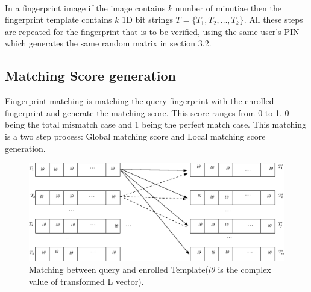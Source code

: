 \documentclass[14pt, oneside]{article}   	%
\begin{document}
\paragraph{}
In a fingerprint image if the image contains $k$ number of minutiae then the fingerprint template contains $k$ 1D bit strings $T=\{ T_1,T_2,\ldots,T_k\}$. All these steps are repeated for the fingerprint that is to be verified, using the same user's PIN which generates the same random matrix in section 3.2. 

\subsection{Matching Score generation}
Fingerprint matching is matching the query fingerprint with the enrolled fingerprint and generate the matching score. This score ranges from 0 to 1. 0 being the total mismatch case and 1 being the perfect match case. This matching is a two step process: Global matching score and Local matching score generation.
\begin{figure}[htbp]
\begin{center}
\includegraphics[width=160mm,scale=0.75]{Matching_fig.eps}
\caption{Matching between query and enrolled Template($l\theta$ is the complex value of transformed L vector).}
\end{center}
\end{figure} 
\end{document}
